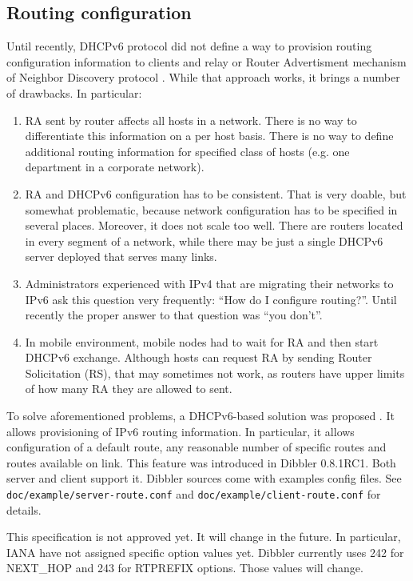 \subsection{Routing configuration}
\label{feature-routing}
Until recently, DHCPv6 protocol did not define a way to provision
routing configuration information to clients and relay or Router
Advertisment mechanism of Neighbor Discovery
protocol \cite{rfc4862}. While that approach works, it brings a number
of drawbacks. In particular:
\begin{enumerate}
\item RA sent by router affects all hosts in a network. There is no
way to differentiate this information on a per host basis. There is no
way to define additional routing information for specified class of
hosts (e.g. one department in a corporate network).
\item RA and DHCPv6 configuration has to be consistent. That is very
doable, but somewhat problematic, because network configuration has to
be specified in several places. Moreover, it does not scale too
well. There are routers located in every segment of a network, while
there may be just a single DHCPv6 server deployed that serves many links.
\item Administrators experienced with IPv4 that are migrating their
networks to IPv6 ask this question very frequently: ``How do I
configure routing?''. Until recently the proper answer to that
question was ``you don't''.
\item In mobile environment, mobile nodes had to wait for RA and then
start DHCPv6 exchange. Although hosts can request RA by sending Router
Solicitation (RS), that may sometimes not work, as routers have upper
limits of how many RA they are allowed to sent.
\end{enumerate}

To solve aforementioned problems, a DHCPv6-based solution was
proposed \cite{draft-route-option}. It allows provisioning of IPv6
routing information. In particular, it allows configuration of a
default route, any reasonable number of specific routes and routes
available on link. This feature was introduced in Dibbler
0.8.1RC1. Both server and client support it. Dibbler sources come with
examples config files. See \verb+doc/example/server-route.conf+
and \verb+doc/example/client-route.conf+ for details. 

\Note This specification is not approved yet. It will change in the
future. In particular, IANA have not assigned specific option values
yet. Dibbler currently uses 242 for NEXT\_HOP and 243 for RTPREFIX
options. Those values will change.

